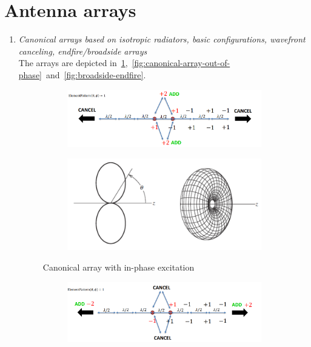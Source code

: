 \documentclass[11pt,a4paper]{article}
\begin{document}
\newpage\section{Antenna arrays}
\begin{enumerate}
    \item \emph{Canonical arrays based on isotropic radiators, basic configurations, wavefront canceling, endfire/broadside arrays}\\
    The arrays are depicted in~\ref{fig:canonical-array-in-phase},~\ref{fig:canonical-array-out-of-phase}~and~\ref{fig:broadside-endfire}.
    \begin{figure}[!ht]
        \centering
        \begin{subfigure}{.45\textwidth}
            \centering
            \includegraphics[width=\textwidth]{src/canonical-array-in-phase.png}
        \end{subfigure}\hfill
        \begin{subfigure}{.45\textwidth}
            \centering
            \includegraphics[width=\textwidth]{src/canonical-array-in-phase-pattern.png}
        \end{subfigure}
        \caption{\label{fig:canonical-array-in-phase}Canonical array with in-phase excitation}
    \end{figure}
    \begin{figure}[!ht]
        \centering
        \begin{subfigure}{.45\textwidth}
            \centering
            \includegraphics[width=\textwidth]{src/canonical-array-out-of-phase.png}

\end{subfigure}
\end{figure}
\end{enumerate}
\end{document}
